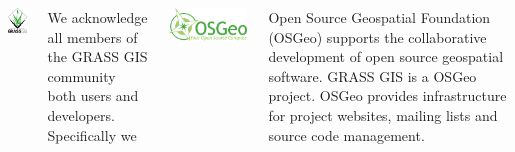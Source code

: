 \documentclass[25pt, margin=0mm, innermargin=15mm, blockverticalspace=15mm, colspace=15mm, subcolspace=8mm]{tikzposter}
\begin{document}
\begin{columns}
{\newcommand{\listhspace}{\hspace{0.005\linewidth}}
\newcommand{\listlogowidth}{0.10\linewidth}
\newcommand{\listtextwidth}{0.82\linewidth}

\begin{minipage}{\listlogowidth}
\centering
\includegraphics[width=0.5\linewidth]{grass}
\end{minipage}
\listhspace
\begin{minipage}{\listtextwidth}
We acknowledge all members of the GRASS GIS community both users and developers.
Specifically we
\end{minipage}

\bigskip

\begin{minipage}{\listlogowidth}
\includegraphics[width=\linewidth]{osgeo}
\end{minipage}
\listhspace
\begin{minipage}{\listtextwidth}
Open Source Geospatial Foundation (OSGeo)
supports the collaborative development of open source geospatial software.
GRASS GIS is a OSGeo project.
OSGeo provides infrastructure for project
websites, mailing lists and source code management.
\end{minipage}

}
\end{columns}
\end{document}
